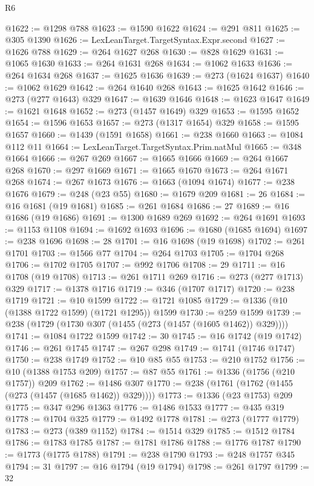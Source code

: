 \begin{lexlean}{R6}
\begin{coremodule}
{{{{{{{{{{{{{{{{{{{@1622 := @1298 @788
@1623 := @1590 @1622
@1624 := @291 @811
@1625 := @305 @1390
@1626 := LexLeanTarget.TargetSyntax.Expr.second
@1627 := @1626 @788
@1629 := @264 @1627 @268
@1630 := @828 @1629
@1631 := @1065 @1630
@1633 := @264 @1631 @268
@1634 := @1062 @1633
@1636 := @264 @1634 @268
@1637 := @1625 @1636
@1639 := @273 (@1624 @1637)
@1640 := @1062 @1629
@1642 := @264 @1640 @268
@1643 := @1625 @1642
@1646 := @273 (@277 @1643) @329
@1647 := @1639 @1646
@1648 := @1623 @1647
@1649 := @1621 @1648
@1652 := @273 (@1457 @1649) @329
@1653 := @1595 @1652
@1654 := @1596 @1653
@1657 := @273 (@1317 @1654) @329
@1658 := @1595 @1657
@1660 := @1439 (@1591 @1658)
@1661 := @238 @1660
@1663 := @1084 @112 @11
@1664 := LexLeanTarget.TargetSyntax.Prim.natMul
@1665 := @348 @1664
@1666 := @267 @269
@1667 := @1665 @1666
@1669 := @264 @1667 @268
@1670 := @297 @1669
@1671 := @1665 @1670
@1673 := @264 @1671 @268
@1674 := @267 @1673
@1676 := @1663 (@1094 @1674)
@1677 := @238 @1676
@1679 := @248 (@23 @55)
@1680 := @1679 @209
@1681 := 26
@1684 := @16 @1681 (@19 @1681)
@1685 := @261 @1684
@1686 := 27
@1689 := @16 @1686 (@19 @1686)
@1691 := @1300 @1689 @269
@1692 := @264 @1691
@1693 := @1153 @1108
@1694 := @1692 @1693
@1696 := @1680 (@1685 @1694)
@1697 := @238 @1696
@1698 := 28
@1701 := @16 @1698 (@19 @1698)
@1702 := @261 @1701
@1703 := @1566 @77
@1704 := @264 @1703
@1705 := @1704 @268
@1706 := @1702 @1705
@1707 := @992 @1706
@1708 := 29
@1711 := @16 @1708 (@19 @1708)
@1713 := @261 @1711 @269
@1716 := @273 (@277 @1713) @329
@1717 := @1378 @1716
@1719 := @346 (@1707 @1717)
@1720 := @238 @1719
@1721 := @10 @1599
@1722 := @1721 @1085
@1729 := @1336 (@10 (@1388 @1722 @1599) (@1721 @1295)) @1599
@1730 := @259 @1599
@1739 := @238 (@1729 (@1730 @307 (@1455 (@273 (@1457 (@1605 @1462)) @329))))
@1741 := @1084 @1722 @1599
@1742 := 30
@1745 := @16 @1742 (@19 @1742)
@1746 := @261 @1745
@1747 := @267 @298
@1749 := @1741 (@1746 @1747)
@1750 := @238 @1749
@1752 := @10 @85 @55
@1753 := @210 @1752
@1756 := @10 (@1388 @1753 @209)
@1757 := @87 @55
@1761 := @1336 (@1756 (@210 @1757)) @209
@1762 := @1486 @307
@1770 := @238 (@1761 (@1762 (@1455 (@273 (@1457 (@1685 @1462)) @329))))
@1773 := @1336 (@23 @1753) @209
@1775 := @347 @296 @1363
@1776 := @1486 @1533
@1777 := @435 @319
@1778 := @1704 @325
@1779 := @1492 @1778
@1781 := @273 (@1777 @1779)
@1783 := @273 (@389 @1152)
@1784 := @1514 @329
@1785 := @1512 @1784
@1786 := @1783 @1785
@1787 := @1781 @1786
@1788 := @1776 @1787
@1790 := @1773 (@1775 @1788)
@1791 := @238 @1790
@1793 := @248 @1757 @345
@1794 := 31
@1797 := @16 @1794 (@19 @1794)
@1798 := @261 @1797
@1799 := 32
}}}}}}}}}}}}}}}}}}}
\end{coremodule}
\end{lexlean}
